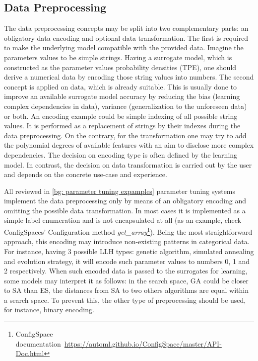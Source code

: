 \subsection{Data Preprocessing}\label{impl: preprocessing}
The data preprocessing concepts may be split into two complementary parts: an obligatory data encoding and optional data transformation. The first is required to make the underlying model compatible with the provided data. Imagine the parameters values to be simple strings. Having a surrogate model, which is constructed as the parameter values probability densities (TPE), one should derive a numerical data by encoding those string values into numbers. The second concept is applied on data, which is already suitable. This is usually done to improve an available surrogate model accuracy by reducing the bias (learning complex dependencies in data), variance (generalization to the unforeseen data) or both. An encoding example could be simple indexing of all possible string values. It is performed as a replacement of strings by their indexes during the data preprocessing. On the contrary, for the transformation one may try to add the polynomial degrees of available features with an aim to disclose more complex dependencies. The decision on encoding type is often defined by the learning model. In contrast, the decision on data transformation is carried out by the user and depends on the concrete use-case and experience.

All reviewed in \cref{bg: parameter tuning expamples} parameter tuning systems implement the data preprocessing only by means of an obligatory encoding and omitting the possible data transformation. In most cases it is implemented as a simple label enumeration and is not encapsulated at all (as an example, check ConfigSpaces' Configuration method \emph{get\_array}\footnote{ConfigSpace documentation~\url{https://automl.github.io/ConfigSpace/master/API-Doc.html}}). Being the most straightforward approach, this encoding may introduce non-existing patterns in categorical data. For instance, having 3 possible LLH types: genetic algorithm, simulated annealing and evolution strategy, it will encode such parameter values to numbers 0, 1 and 2 respectively. When such encoded data is passed to the surrogates for learning, some models may interpret it as follows: in the search space, GA could be closer to SA than ES, the distances from SA to two others algorithms are equal within a search space. To prevent this, the other type of preprocessing should be used, for instance, binary encoding.


